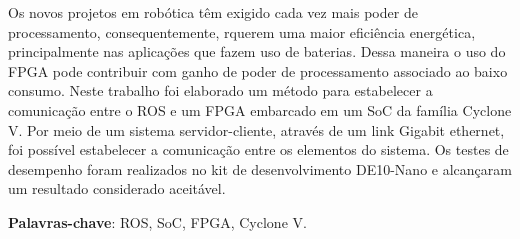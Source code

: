 
\setlength{\absparsep}{18pt} %
\begin{resumo}
    Os novos projetos em robótica têm exigido cada vez mais poder de processamento, consequentemente, rquerem uma maior eficiência energética, principalmente nas aplicações que fazem uso de baterias. Dessa maneira o uso do FPGA pode contribuir com ganho de poder de processamento associado ao baixo consumo. Neste trabalho foi elaborado um método para estabelecer a comunicação entre o ROS e um FPGA embarcado em um SoC da família Cyclone V. Por meio de um sistema servidor-cliente, através de um link Gigabit ethernet, foi possível estabelecer a comunicação entre os elementos do sistema. Os testes de desempenho foram realizados no kit de desenvolvimento DE10-Nano e alcançaram um resultado considerado aceitável.

    \vspace{\onelineskip}

 \textbf{Palavras-chave}: ROS, SoC, FPGA, Cyclone V.
\end{resumo}
